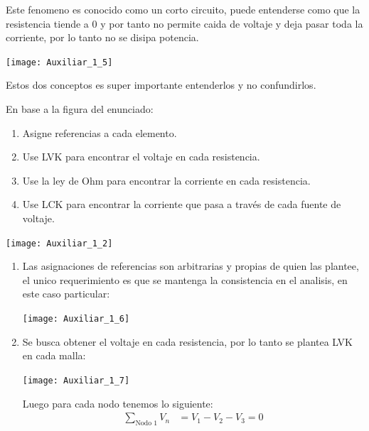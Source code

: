 \documentclass[
  11pt,
  letterpaper,
   addpoints,
   answers
  ]{exam}
\begin{document}
\begin{questions}
\begin{solution}
\begin{enumerate}
\begin{equation}
        \end{equation}
        Este fenomeno es conocido como un corto circuito, puede entenderse como que la resistencia tiende a 0 y por tanto no permite caida de voltaje y deja pasar toda la corriente, por lo tanto no se disipa potencia.
        \begin{center}
            \texttt{[image: Auxiliar\_1\_5]}
        \end{center}
        Estos dos conceptos es super importante entenderlos y no confundirlos.
    \end{enumerate}
    \end{solution}
\question  En base a la figura del enunciado:
\begin{enumerate}
    \item Asigne referencias a cada elemento.
    \item Use LVK para encontrar el voltaje en cada resistencia.
    \item Use la ley de Ohm para encontrar la corriente en cada resistencia.
    \item Use LCK para encontrar la corriente que pasa a través de cada fuente de voltaje.
\end{enumerate}
\begin{center}
    \texttt{[image: Auxiliar\_1\_2]}
\end{center}
\begin{solution}
   \begin{enumerate}
    \item Las asignaciones de referencias son arbitrarias y propias de quien las plantee, el unico requerimiento es que se mantenga la consistencia en el analisis, en este caso particular:
    \begin{center}
        \texttt{[image: Auxiliar\_1\_6]}
    \end{center}
    \item Se busca obtener el voltaje en cada resistencia, por lo tanto se plantea LVK en cada malla:
    \begin{center}
        \texttt{[image: Auxiliar\_1\_7]}
    \end{center}
    Luego para cada nodo tenemos lo siguiente:
    \begin{align}
        \sum_{\text{Nodo 1}} V_{n} &= V_{1} - V_{2} - V_{3} = 0\\

\end{align}
\end{enumerate}
\end{solution}
\end{questions}
\end{document}
